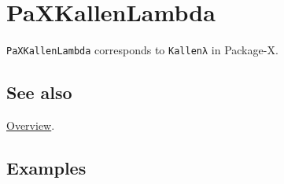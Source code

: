 \documentclass[../FeynHelpersManual.tex]{subfiles}
\begin{document}
\hypertarget{paxkallenlambda}{
\section{PaXKallenLambda}\label{paxkallenlambda}}

\texttt{PaXKallenLambda} corresponds to \texttt{Kallenλ} in Package-X.

\subsection{See also}

\hyperlink{toc}{Overview}.

\subsection{Examples}
\end{document}
